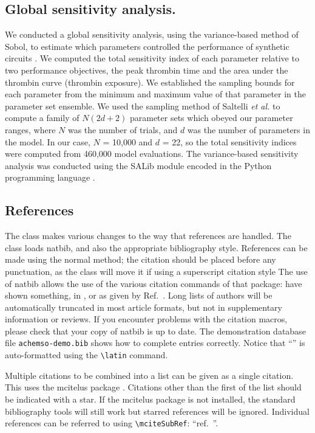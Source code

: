 \documentclass[journal=asbcd6,manuscript=article]{achemso}
\begin{document}
\subsection*{Global sensitivity analysis.}
We conducted a global sensitivity analysis, using the variance-based method of Sobol, to estimate which parameters controlled the performance of synthetic circuits \citep{SOBOL_METHOD}.
We computed the total sensitivity index of each parameter relative to two performance objectives, the peak thrombin time and the area under the thrombin curve (thrombin exposure).
We established the sampling bounds for each parameter from the minimum and maximum value of that parameter in the parameter set ensemble.
We used the sampling method of Saltelli \textit{et al.} \citep{Saltelli:2010} to compute a family of $N\left(2d+2\right)$ parameter sets which obeyed our parameter ranges,
where $N$ was the number of trials, and $d$ was the number of parameters in the model. In our case, $N$ = 10,000 and $d$ = 22, so the total sensitivity indices were computed from
460,000 model evaluations. The variance-based sensitivity analysis was conducted using the SALib module encoded in the Python programming language \citep{SALIB}.


\subsection{References}

The class makes various changes to the way that references are
handled.  The class loads \textsf{natbib}, and also the
appropriate bibliography style.  References can be made using
the normal method; the citation should be placed before any
punctuation, as the class will move it if using a superscript
citation style
The use of \textsf{natbib} allows the use of the various citation
commands of that package: \citeauthor{Abernethy2003} have shown
something, in \citeyear{Cotton1999}, or as given by
Ref.~.  Long lists of authors will be
automatically truncated in most article formats, but not in
supplementary information or reviews. If you
encounter problems with the citation macros, please check that
your copy of \textsf{natbib} is up to date. The demonstration
database file \texttt{achemso-demo.bib} shows how to complete
entries correctly. Notice that ``'' is auto-formatted
using the \texttt{\textbackslash latin} command.

Multiple citations to be combined into a list can be given as
a single citation.  This uses the \textsf{mcitelus} package
\cite{Johnson1972,*Arduengo1992,*Eisenstein2005,*Arduengo1994}.
Citations other than the first of the list should be indicated
with a star. If the \textsf{mcitelus} package is not installed,
the standard bibliography tools will still work but starred
references will be ignored. Individual references can be referred
to using \texttt{\textbackslash mciteSubRef}:
``ref.~''.
\end{document}
